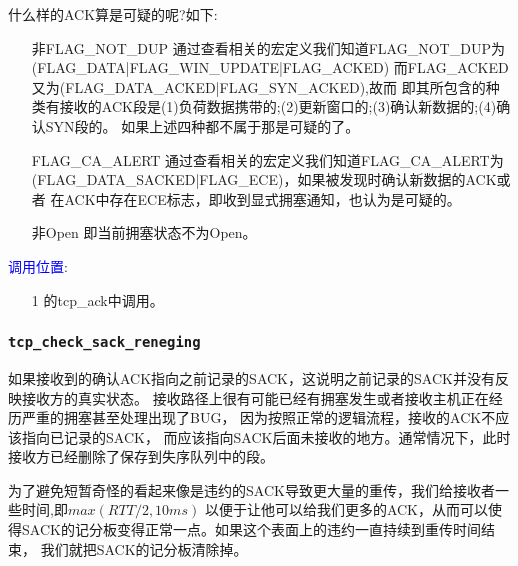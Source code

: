     什么样的ACK算是可疑的呢?如下:
\begin{enumerate}
\item[非FLAG\_NOT\_DUP] 通过查看相关的宏定义我们知道FLAG\_NOT\_DUP为(FLAG\_DATA|FLAG\_WIN\_UPDATE|FLAG\_ACKED)
                        而FLAG\_ACKED又为(FLAG\_DATA\_ACKED|FLAG\_SYN\_ACKED),故而
                        即其所包含的种类有接收的ACK段是(1)负荷数据携带的;(2)更新窗口的;(3)确认新数据的;(4)确认SYN段的。
                        如果上述四种都不属于那是可疑的了。
            
\item[FLAG\_CA\_ALERT]  通过查看相关的宏定义我们知道FLAG\_CA\_ALERT为(FLAG\_DATA\_SACKED|FLAG\_ECE)，如果被发现时确认新数据的ACK或者
                        在ACK中存在ECE标志，即收到显式拥塞通知，也认为是可疑的。\color{red}{似乎和上面的有矛盾，}
\item[非Open]           即当前拥塞状态不为Open。
\end{enumerate}

        \textcolor{blue}{调用位置}:
            \begin{enumerate}
                \item[1]        \label{ClientReceiveSYN+ACK:tcp_ack}的tcp\_ack中调用。
            \end{enumerate}

        \subsubsection{\texttt{tcp_check_sack_reneging}}
            如果接收到的确认ACK指向之前记录的SACK，这说明之前记录的SACK并没有反映接收方的真实状态。
            接收路径上很有可能已经有拥塞发生或者接收主机正在经历严重的拥塞甚至处理出现了BUG，
            因为按照正常的逻辑流程，接收的ACK不应该指向已记录的SACK，
            而应该指向SACK后面未接收的地方。通常情况下，此时接收方已经删除了保存到失序队列中的段。
            
            为了避免短暂奇怪的看起来像是违约的SACK导致更大量的重传，我们给接收者一些时间,即$max(RTT/2, 10ms)$
            以便于让他可以给我们更多的ACK，从而可以使得SACK的记分板变得正常一点。如果这个表面上的违约一直持续到重传时间结束，
            我们就把SACK的记分板清除掉。

